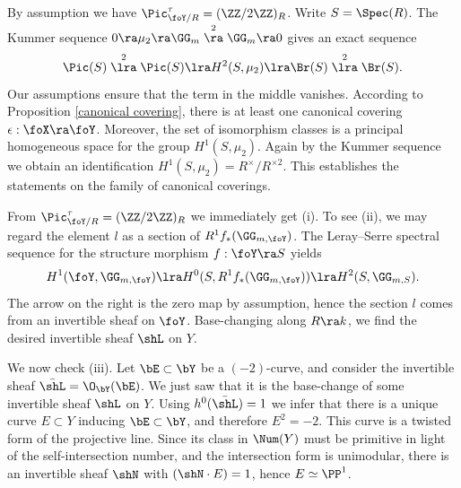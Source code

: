 \proof
By assumption we have $\Pic^\tau_{\foY/R}=(\ZZ/2\ZZ)_R$.
Write $S=\Spec(R)$. The Kummer sequence $0\ra \mu_2\ra\GG_m\stackrel{2}\ra\GG_m\ra 0$ gives an exact sequence
$$
\Pic(S)\stackrel{2}{\lra}\Pic(S)\lra H^2(S,\mu_{2})\lra \Br(S)\stackrel{2}{\lra}\Br(S).
$$
Our assumptions ensure that the term in the middle vanishes.
According to Proposition \ref{canonical covering},   there is at least one canonical covering $\epsilon:\foX\ra\foY$.
Moreover, the set of isomorphism classes is a principal homogeneous space for the group $H^1(S,\mu_2)$.
Again by the Kummer sequence we obtain an identification $H^1(S,\mu_2)=R^\times/R^{\times 2}$.
This establishes the statements on the family of canonical coverings.

From $\Pic^\tau_{\foY/R}=(\ZZ/2\ZZ)_R$ we immediately get (i).
To see (ii), we may regard the element $l$ as a section of $R^1f_*(\GG_{m,\foY})$.
The Leray--Serre spectral sequence for the structure morphism $f:\foY\ra S$ yields
$$
H^1(\foY,\GG_{m,\foY})\lra H^0(S, R^1f_*(\GG_{m,\foY}))\lra H^2(S,\GG_{m,S}).
$$
The arrow on the right is the zero map  by assumption, hence the section $l$ comes from an invertible sheaf on $\foY$.
Base-changing along $R\ra k$, we find the desired invertible sheaf $\shL$ on $Y$.


We now check (iii).  Let $\bE\subset\bY$ be a $(-2)$-curve, and consider the invertible sheaf $\bar{\shL}=\O_{\bY}(\bE)$.
We just saw that it is  the base-change of some invertible sheaf $\shL$ on $Y$.
Using $h^0(\bar{\shL})=1$ we infer that there is a unique curve $E\subset Y$ inducing $\bE\subset\bY$, and therefore $E^2=-2$.
This curve is  a twisted form of the projective line. Since its class in $\Num(Y)$ must be primitive in light of the self-intersection number,
and  the intersection form is unimodular,   there
is an invertible sheaf $\shN$ with $(\shN\cdot E)=1$, hence $E\simeq \PP^1$.

